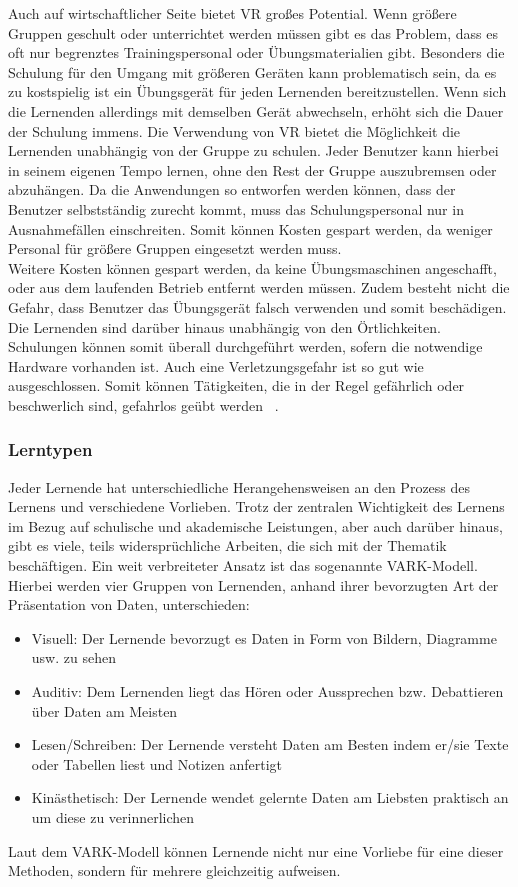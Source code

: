 Auch auf wirtschaftlicher Seite bietet VR großes Potential. Wenn größere Gruppen geschult oder unterrichtet werden müssen gibt es das Problem, dass es oft nur begrenztes Trainingspersonal oder Übungsmaterialien gibt. Besonders die Schulung für den Umgang mit größeren Geräten kann problematisch sein, da es zu kostspielig ist ein Übungsgerät für jeden Lernenden bereitzustellen. Wenn sich die Lernenden allerdings mit demselben Gerät abwechseln, erhöht sich die Dauer der Schulung immens. Die Verwendung von VR bietet die Möglichkeit die Lernenden unabhängig von der Gruppe zu schulen. Jeder Benutzer kann hierbei in seinem eigenen Tempo lernen, ohne den Rest der Gruppe auszubremsen oder abzuhängen. Da die Anwendungen so entworfen werden können, dass der Benutzer selbstständig zurecht kommt, muss das Schulungspersonal nur in Ausnahmefällen einschreiten. Somit können Kosten gespart werden, da weniger Personal für größere Gruppen eingesetzt werden muss.\\

Weitere Kosten können gespart werden, da keine Übungsmaschinen angeschafft, oder aus dem laufenden Betrieb entfernt werden müssen. Zudem besteht nicht die Gefahr, dass Benutzer das Übungsgerät falsch verwenden und somit beschädigen. Die Lernenden sind darüber hinaus unabhängig von den Örtlichkeiten. Schulungen können somit überall durchgeführt werden, sofern die notwendige Hardware vorhanden ist. Auch eine Verletzungsgefahr ist so gut wie ausgeschlossen. Somit können Tätigkeiten, die in der Regel gefährlich oder beschwerlich sind, gefahrlos geübt werden ~\parencite{Buehler2020}.

\subsubsection{Lerntypen}
Jeder Lernende hat unterschiedliche Herangehensweisen an den Prozess des Lernens und verschiedene Vorlieben. Trotz der zentralen Wichtigkeit des Lernens im Bezug auf schulische und akademische Leistungen, aber auch darüber hinaus, gibt es viele, teils widersprüchliche Arbeiten, die sich mit der Thematik beschäftigen. Ein weit verbreiteter Ansatz ist das sogenannte VARK-Modell. Hierbei werden vier Gruppen von Lernenden, anhand ihrer bevorzugten Art der Präsentation von Daten, unterschieden:
\begin{itemize}
\item Visuell: Der Lernende bevorzugt es Daten in Form von Bildern, Diagramme usw. zu sehen 
\item Auditiv: Dem Lernenden liegt das Hören oder Aussprechen bzw. Debattieren über Daten am Meisten
\item Lesen/Schreiben: Der Lernende versteht Daten am Besten indem er/sie Texte oder Tabellen liest und Notizen anfertigt
\item Kinästhetisch: Der Lernende wendet gelernte Daten am Liebsten praktisch an um diese zu verinnerlichen
\end{itemize}
Laut dem VARK-Modell können Lernende nicht nur eine Vorliebe für eine dieser Methoden, sondern für mehrere gleichzeitig aufweisen. \\

